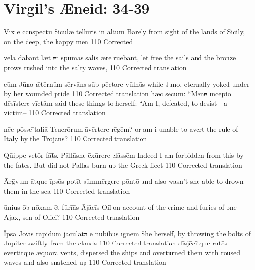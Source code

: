 \newpage
\section{Virgil's {\AE}neid:  34-39} %

\latline
  {V\=ix \={\macron e} c\={\macron o}nsp\=ect\={\macron u} S\-ic\-ul\={\ae} t\=ell\={\macron u}r\-is \-in \=alt\=um }
  {Barely from sight of the lands of Sicily, on the deep, the happy men}
  {110} %
  {Corrected}
  {
  }

\latline
  {v\={\macron e}l\-a d\-ab\=ant l\={\ae}t\={\macron{\i}}\sout{ e}t sp\={\macron u}m\={\macron a}s s\-al\-is \={\ae}r\-e r\-u\={\macron e}b\=ant,}
  {let free the sails and the bronze prows rushed into the salty waves,  }
  {110} %
  {Corrected translation}
  {
  }

\latline
  {c\=um J\={\macron u}n\sout{o }\={\ae}t\=ern\=um s\=erv\={\macron a}ns s\=ub p\=ect\-or\-e v\=uln\={\macron u}s}
  {while Juno, eternally yoked under by her wounded pride}
  {110} %
  {Corrected translation}
  {
  }
\newpage
\latline
  {h\={\ae}c s\={\macron e}c\=um:  ``M\={\macron e}n\sout{e }\=inc\=ept\={\macron o} d\={\macron e}s\=ist\-er\-e v\=ict\=am}
  {said these things to herself:  ``Am I, defeated, to desist---a victim--}
  {110} %
  {Corrected translation}
  {
  }

\latline
  {n\=ec p\=oss\sout{e }\={}t\-al\-i\={\macron a} T\-e\-ucr\={\macron o}r\sout{um }\={\macron a}v\=ert\-er\-e r\={\macron e}g\=em?}
  {or am i unable to avert the rule of Italy by the Trojans? }
  {110} %
  {Corrected translation}
  {
  }

\latline
  {Q\={ui}pp\-e v\-et\=or f\={\macron a}t\={\macron{\i}}s.  P\=all\=asn\sout{e }\=ex\={\macron u}r\-er\-e cl\=ass\=em}
  {Indeed I am forbidden from this by the fates.  But did not Pallas burn up the Greek fleet }
  {110} %
  {Corrected translation}
  {
  }

\newpage

\latline
  {\=Arg\={\macron{\i}}v\sout{um }\=atqu\sout{e }\=ips\={\macron o}s p\-ot\=it s\=umm\=erg\-er\-e p\=ont\={\macron o}}
  {and also wasn't she able to drown them in the sea}
  {110} %
  {Corrected translation}
  {
  }

\latline
  {\={\macron u}n\-i\-us \=ob n\=ox\sout{am }\=et f\=ur\=i\={\macron a}s \=Aj\={\macron a}c\=is \-O\-il\={\macron{\i}}}
  {on account of the crime and furies of one Ajax, son of Oliei?}
  {110} %
  {Corrected translation}
  {
  }

\latline
  {\=Ips\-a J\-ov\=is r\-ap\-id\=um j\-ac\-ul\={\macron a}t\sout{a }\={\macron e} n\={\macron u}b\-ib\-us \=ign\=em}
  {She herself, by throwing the bolts of Jupiter swiftly from the clouds}
  {110} %
  {Corrected translation}
  {
  }
\newpage
\latline
  {d\=isj\={\macron e}c\=itqu\-e r\-at\={\macron e}s \={\macron e}v\=ert\-itqu\-e \={\ae}qu\-or\-a v\=ent\={\macron{\i}}s,}
  {dispersed the ships and overturned them with roused waves and also snatched up }
  {110} %
  {Corrected translation}
  {
  }

